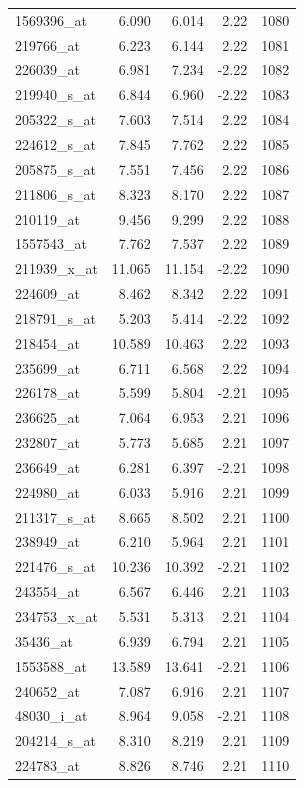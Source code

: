 \begin{footnotesize}
\begin{longtable}{lrrrr}
1569396\_at & 6.090 & 6.014 & 2.22 & 1080 \\
219766\_at & 6.223 & 6.144 & 2.22 & 1081 \\
226039\_at & 6.981 & 7.234 & -2.22 & 1082 \\
219940\_s\_at & 6.844 & 6.960 & -2.22 & 1083 \\
205322\_s\_at & 7.603 & 7.514 & 2.22 & 1084 \\
224612\_s\_at & 7.845 & 7.762 & 2.22 & 1085 \\
205875\_s\_at & 7.551 & 7.456 & 2.22 & 1086 \\
211806\_s\_at & 8.323 & 8.170 & 2.22 & 1087 \\
210119\_at & 9.456 & 9.299 & 2.22 & 1088 \\
1557543\_at & 7.762 & 7.537 & 2.22 & 1089 \\
211939\_x\_at & 11.065 & 11.154 & -2.22 & 1090 \\
224609\_at & 8.462 & 8.342 & 2.22 & 1091 \\
218791\_s\_at & 5.203 & 5.414 & -2.22 & 1092 \\
218454\_at & 10.589 & 10.463 & 2.22 & 1093 \\
235699\_at & 6.711 & 6.568 & 2.22 & 1094 \\
226178\_at & 5.599 & 5.804 & -2.21 & 1095 \\
236625\_at & 7.064 & 6.953 & 2.21 & 1096 \\
232807\_at & 5.773 & 5.685 & 2.21 & 1097 \\
236649\_at & 6.281 & 6.397 & -2.21 & 1098 \\
224980\_at & 6.033 & 5.916 & 2.21 & 1099 \\
211317\_s\_at & 8.665 & 8.502 & 2.21 & 1100 \\
238949\_at & 6.210 & 5.964 & 2.21 & 1101 \\
221476\_s\_at & 10.236 & 10.392 & -2.21 & 1102 \\
243554\_at & 6.567 & 6.446 & 2.21 & 1103 \\
234753\_x\_at & 5.531 & 5.313 & 2.21 & 1104 \\
35436\_at & 6.939 & 6.794 & 2.21 & 1105 \\
1553588\_at & 13.589 & 13.641 & -2.21 & 1106 \\
240652\_at & 7.087 & 6.916 & 2.21 & 1107 \\
48030\_i\_at & 8.964 & 9.058 & -2.21 & 1108 \\
204214\_s\_at & 8.310 & 8.219 & 2.21 & 1109 \\
224783\_at & 8.826 & 8.746 & 2.21 & 1110 \\

\end{longtable}
\end{footnotesize}
